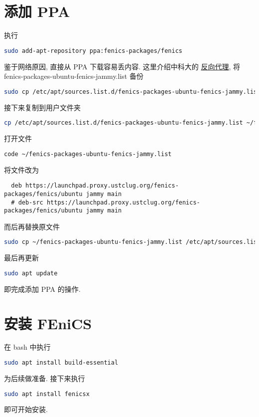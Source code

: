 \documentclass[fontset=founder]{ctexrep}
\begin{document}
\section{添加 PPA}

执行
\begin{lstlisting}[language = bash]
  sudo add-apt-repository ppa:fenics-packages/fenics
\end{lstlisting}
鉴于网络原因,
直接从 PPA 下载容易丢内容.
这里介绍中科大的%
\href{https://mirrors.ustc.edu.cn/}{反向代理},
将 \textsf{fenics-packages-ubuntu-fenics-jammy.list} 备份
\begin{lstlisting}[language = bash]
  sudo cp /etc/apt/sources.list.d/fenics-packages-ubuntu-fenics-jammy.list /etc/apt/sources.list.d/fenics-packages-ubuntu-fenics-jammy.list.bak
\end{lstlisting}
接下来复制到用户文件夹
\begin{lstlisting}[language = bash]
  cp /etc/apt/sources.list.d/fenics-packages-ubuntu-fenics-jammy.list ~/fenics-packages-ubuntu-fenics-jammy.list
\end{lstlisting}
打开文件
\begin{lstlisting}[language = bash]
  code ~/fenics-packages-ubuntu-fenics-jammy.list
\end{lstlisting}
将文件改为
\begin{lstlisting}
  deb https://launchpad.proxy.ustclug.org/fenics-packages/fenics/ubuntu jammy main
  # deb-src https://launchpad.proxy.ustclug.org/fenics-packages/fenics/ubuntu jammy main
\end{lstlisting}
而后再替换原文件
\begin{lstlisting}[language = bash]
  sudo cp ~/fenics-packages-ubuntu-fenics-jammy.list /etc/apt/sources.list.d/fenics-packages-ubuntu-fenics-jammy.list
\end{lstlisting}
最后再更新
\begin{lstlisting}[language = bash]
  sudo apt update
\end{lstlisting}
即完成添加 PPA 的操作.

\section{安装 FEniCS}

在 \textsf{bash} 中执行
\begin{lstlisting}[language = bash]
  sudo apt install build-essential
\end{lstlisting}
为后续做准备.
接下来执行
\begin{lstlisting}[language = bash]
  sudo apt install fenicsx
\end{lstlisting}
即可开始安装.
\end{document}

